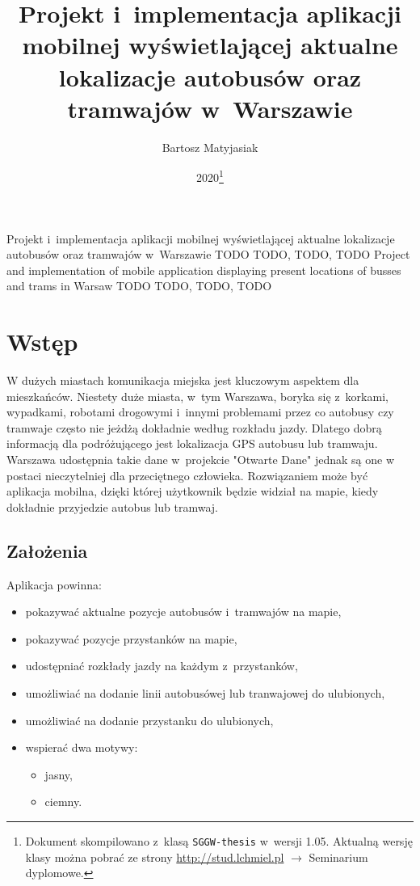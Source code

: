 \documentclass{SGGW-thesis}
\title{Projekt i~implementacja aplikacji mobilnej wyświetlającej aktualne lokalizacje autobusów oraz tramwajów w~Warszawie}
\author{Bartosz Matyjasiak}
\date{2020\footnote{Dokument skompilowano z~klasą {\tt SGGW-thesis} w~wersji 1.05. Aktualną wersję klasy można pobrać ze strony \url{http://stud.lchmiel.pl} $\rightarrow$ Seminarium dyplomowe.}}
\begin{document}
\maketitle
\statementpage
\abstractpage
{Projekt i~implementacja aplikacji mobilnej wyświetlającej aktualne lokalizacje autobusów oraz tramwajów w~Warszawie}
{TODO}
{TODO, TODO, TODO}
{Project and implementation of mobile application displaying present locations of busses and trams in Warsaw}
{TODO}
{TODO, TODO, TODO}


{
  \doublespacing
  \tableofcontents
}

\startchapterfromoddpage %


\chapter{Wstęp}
W dużych miastach komunikacja miejska jest kluczowym aspektem dla mieszkańców.
Niestety duże miasta, w~tym Warszawa, boryka się z~korkami, wypadkami, robotami drogowymi i~innymi problemami przez
co autobusy czy tramwaje często nie jeżdżą dokładnie według rozkładu jazdy.
Dlatego dobrą informacją dla podróżującego jest lokalizacja GPS autobusu lub tramwaju.
Warszawa udostępnia takie dane w~projekcie "Otwarte Dane" jednak są one w postaci nieczytelniej dla przeciętnego człowieka.
Rozwiązaniem może być aplikacja mobilna, dzięki której użytkownik będzie widział na mapie, kiedy dokładnie przyjedzie autobus lub tramwaj.
\section{Założenia}
Aplikacja powinna:
\label{ZALOZENIA}
\begin{itemize}
  \item{pokazywać aktualne pozycje autobusów i~tramwajów na mapie,}
  \item{pokazywać pozycje przystanków na mapie,}
  \item{udostępniać rozkłady jazdy na każdym z~przystanków,}
  \item{umożliwiać na dodanie linii autobusówej lub tranwajowej do ulubionych,}
  \item{umożliwiać na dodanie przystanku do ulubionych,}
  \item{wspierać dwa motywy:}
  \begin{itemize}
    \item{jasny,}
    \item{ciemny.}
  \end{itemize}
\end{itemize}
\vfill
\pagebreak
\end{document}
